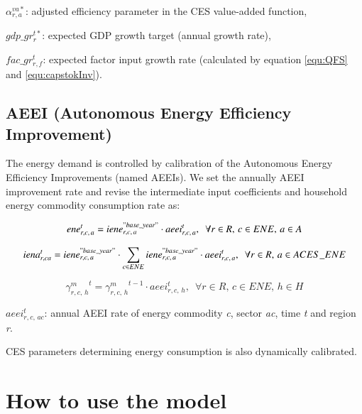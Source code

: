 \documentclass[10pt,a4paper,titlepage,dvipdfmx]{book}
\begin{document}
\begin{flushleft}
$\alpha _{r,a}^{va*}$: adjusted efficiency parameter in the CES value-added function,

$gdp\_ gr_{r}^{t*}$: expected GDP growth target (annual growth rate),

$fac\_ gr_{r,f}^{t}$: expected factor input growth rate (calculated by equation \ref{equ:QFS} and \ref{equ:capstokInv}).
\end{flushleft}

\section{\label{sec:AEEI}AEEI (Autonomous Energy Efficiency Improvement)}

The energy demand is controlled by calibration of the Autonomous Energy Efficiency Improvements (named AEEIs). We set the annually AEEI improvement rate and revise the intermediate input coefficients and household energy commodity consumption rate as:

\begin{equation}
\label{equ:eneinp1}
ene_{r,c,\,a}^{t}=iene_{r,c,\,a}^{"base\_ year"}\cdot aeei_{r,c,\,a}^{t},\,\,\,\forall r\in R,\,c\in ENE,\,a\in A \\
\end{equation}

\begin{equation}
\label{equ:eneinp2}
iena_{r,ca}^{t}=iene_{r,c,\,a}^{"base\_ year"}\cdot \sum _{c\in ENE}iene_{r,c,\,a}^{"base\_ year"}\cdot aeei_{r,c,\,a}^{t},\,\,\,\forall r\in R,\,a\in ACES\_ ENE \\
\end{equation}

\begin{equation}
\label{equ:eneinp3}
{\gamma^{m}_{r,c,\,h}}^{t} = {\gamma^{m}_{r,c,\,h}}^{t-1}\cdot aeei_{r,c,\,h}^{t},\,\,\,\forall r\in R,\,c\in ENE,\,h\in H 
\end{equation}

\begin{flushleft} $aeei_{r,c,\,ac}^{t}$: annual AEEI rate of energy commodity \textit{c}, sector \textit{ac}, time \textit{t} and region \textit{r}. \end{flushleft}

CES parameters determining energy consumption is also dynamically calibrated.

\chapter{\label{chp:HowtoUse}How to use the model}
\end{document}
